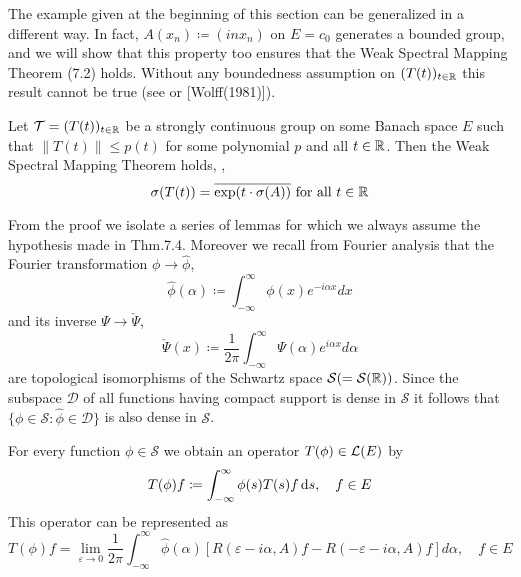 The example given at the beginning of this section can be generalized in a different way.
In fact, $A(x_{n}) \coloneqq (inx_{n})$ on $E = c_{0}$ generates a bounded group, and we will show that this property too ensures that the Weak Spectral Mapping Theorem (7.2) holds.
Without any boundedness assumption on $(T(t))_{t\in\mathbb{R}}$ this result cannot be true (see \citet[Sec.23.16]{hillephillips:1957} or [Wolff(1981)]).
\begin{theorem}\label{thm:a3-7.4}
Let $\mathcal{T} = (T(t))_{t\in\mathbb{R}}$ be a strongly continuous group on some Banach space $E$ such that $\|T(t)\| \leq p(t)$ for some polynomial $p$ and all $t \in \mathbb{R}$.
Then the Weak Spectral Mapping Theorem holds, \ie,
\[
\sigma(T(t)) = \overline{\exp(t\cdot\sigma(A))} \text{ for all } t \in \mathbb{R}
\]
\end{theorem}
From the proof we isolate a series of lemmas for which we always assume the hypothesis made in Thm.7.4.
Moreover we recall from Fourier analysis that the Fourier transformation $\phi \to \hat{\phi}$,
\[
\hat{\phi}(\alpha) \coloneqq \int_{-\infty}^{\infty} \phi(x)e^{-i\alpha x} dx
\]
and its inverse $\Psi \to \check{\Psi}$,
\[
\check{\Psi}(x) \coloneqq \frac{1}{2\pi}\int_{-\infty}^{\infty} \Psi(\alpha)e^{i\alpha x} d\alpha
\]
are topological isomorphisms of the Schwartz space $\mathcal{S} ( = \mathcal{S}(\mathbb{R}))$.
Since the subspace $\mathcal{D}$ of all functions having compact support is dense in $\mathcal{S}$ it follows that $\{\phi \in \mathcal{S} \colon \hat{\phi} \in \mathcal{D}\}$ is also dense in $\mathcal{S}$.
\begin{lemma}\label{lem:a3-7.5}
For every function $\phi \in \mathcal{S}$ we obtain an operator $T(\phi) \in \mathcal{L}(E)$ by
\[
T(\phi)f \coloneqq \int_{-\infty}^{\infty} \phi(s)T(s)f \mathop{}\!\mathrm{d}{s}, \quad f \in E
\]
This operator can be represented as
\begin{equation}\label{eq:a3-7.4}
T(\phi)f = \lim_{\varepsilon\to 0} \frac{1}{2\pi}\int_{-\infty}^{\infty} \hat{\phi}(\alpha)[R(\varepsilon-i\alpha,A)f - R(-\varepsilon-i\alpha,A)f] d\alpha, \quad f \in E
\end{equation}
\end{lemma}
